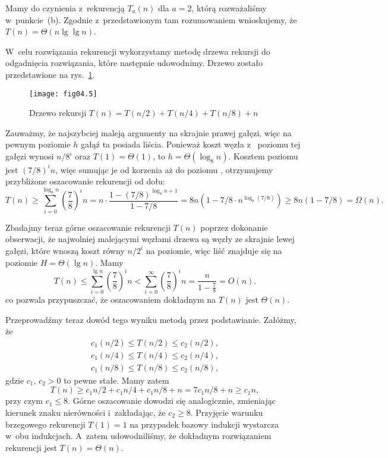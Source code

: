 \subproblem %
Mamy do czynienia z~rekurencją $T_a(n)$ dla $a=2$, którą rozważaliśmy w~punkcie~(b). Zgodnie z~przedstawionym tam rozumowaniem wnioskujemy, że $T(n)=\Theta(n\lg\lg n)$.

\subproblem %
W~celu rozwiązania rekurencji wykorzystamy metodę drzewa rekursji do odgadnięcia rozwiązania, które następnie udowodnimy. Drzewo zostało przedstawione na rys.~\ref{fig:4-4f}.
\begin{figure}[ht]
	\begin{center}
		\texttt{[image: fig04.5]}
	\end{center}
	\caption{Drzewo rekursji $T(n)=T(n/2)+T(n/4)+T(n/8)+n$} \label{fig:4-4f}
\end{figure}

Zauważmy, że najszybciej maleją argumenty na skrajnie prawej gałęzi, więc na pewnym poziomie $h$ gałąź ta posiada liścia. Ponieważ koszt węzła z~ poziomu tej gałęzi wynosi $n/8^i$ oraz $T(1)=\Theta(1)$, to $h=\Theta(\log_8n)$. Kosztem  poziomu jest $(7/8)^in$, więc sumując je od korzenia aż do poziomu , otrzymujemy przybliżone oszacowanie rekurencji od dołu:
\[
	T(n) \ge \sum_{i=0}^{\log_8n}\left(\frac{7}{8}\right)^in = n\cdot\frac{1-(7/8)^{\log_8n+1}}{1-7/8} = 8n(1-7/8\cdot n^{\log_8(7/8)}) \ge 8n(1-7/8) = \Omega(n).
\]

Zbadajmy teraz górne oszacowanie rekurencji $T(n)$ poprzez dokonanie obserwacji, że najwolniej malejącymi węzłami drzewa są węzły ze skrajnie lewej gałęzi, które wnoszą koszt równy $n/2^i$ na  poziomie, więc liść znajduje się na poziomie $H=\Theta(\lg n)$. Mamy
\[
	T(n) \le \sum_{i=0}^{\lg n}\left(\frac{7}{8}\right)^in < \sum_{i=0}^\infty\left(\frac{7}{8}\right)^in = \frac{n}{1-\frac{7}{8}} = O(n).
\]
co pozwala przypuszczać, że oszacowaniem dokładnym na $T(n)$ jest $\Theta(n)$.

Przeprowadźmy teraz dowód tego wyniku metodą przez podstawianie. Załóżmy, że
\begin{gather*}
	c_1(n/2) \le T(n/2) \le c_2(n/2), \\
	c_1(n/4) \le T(n/4) \le c_2(n/4), \\
	c_1(n/8) \le T(n/8) \le c_2(n/8),
\end{gather*}
gdzie $c_1$, $c_2>0$ to pewne stałe. Mamy zatem
\[
	T(n) \ge c_1n/2+c_1n/4+c_1n/8+n = 7c_1n/8+n \ge c_1n,
\]
przy czym $c_1\le8$. Górne oszacowanie dowodzi się analogicznie, zmieniając kierunek znaku nierówności i~zakładając, że $c_2\ge8$. Przyjęcie warunku brzegowego rekurencji $T(1)=1$ na przypadek bazowy indukcji wystarcza w~obu indukcjach. A~zatem udowodniliśmy, że dokładnym rozwiązaniem rekurencji jest $T(n)=\Theta(n)$.

